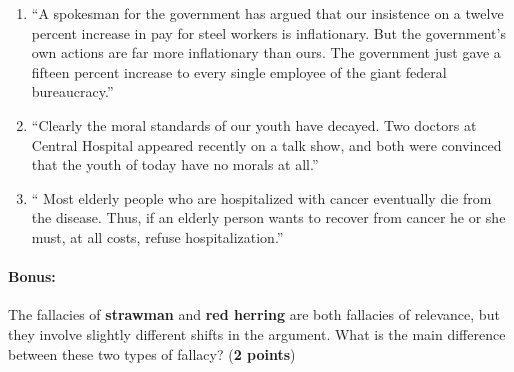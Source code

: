 \documentclass[10pt]{article}
\begin{document}
\begin{enumerate}
  
  \item ``A spokesman for the government has argued that our insistence on a twelve percent increase in pay for steel workers is inflationary. But the government's own actions are far more inflationary than ours. The government just gave a fifteen percent increase to every single employee of the giant federal bureaucracy.''
  
  \item ``Clearly the moral standards of our youth have decayed. Two doctors at Central Hospital appeared recently on a talk show, and both were convinced that the youth of today have no morals at all.''
  
  \item `` Most elderly people who are hospitalized with cancer eventually die from the disease. Thus, if an elderly person wants to recover from cancer he or she must, at all costs, refuse hospitalization.''
  
\end{enumerate}  

\vspace{1in}
  
\paragraph{Bonus:}  The fallacies of \textbf{strawman} and \textbf{red herring} are both fallacies of relevance, but they involve slightly different shifts in the argument.  What is the main difference between these two types of fallacy? (\textbf{2 points})
\end{document}
